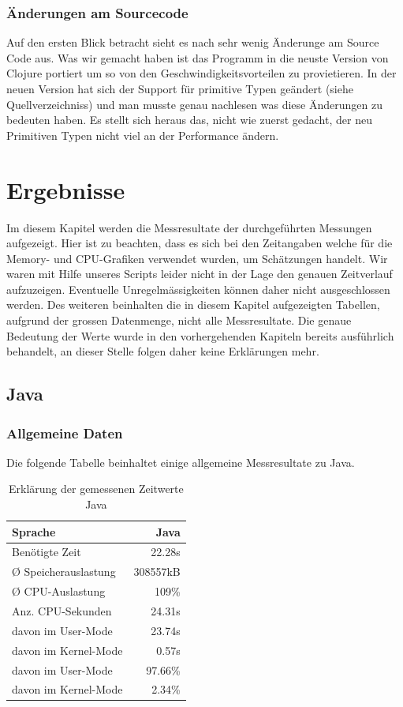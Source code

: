 \documentclass{fancydocument}
\begin{document}
\subsubsection{\"Anderungen am Sourcecode}

Auf den ersten Blick betracht sieht es nach sehr wenig \"Anderunge am
Source Code aus. Was wir gemacht haben ist das Programm in die neuste
Version von Clojure portiert um so von den Geschwindigkeitsvorteilen
zu provietieren. In der neuen Version hat sich der Support f\"ur
primitive Typen ge\"andert (siehe Quellverzeichniss) und man musste
genau nachlesen was diese \"Anderungen zu bedeuten haben. Es stellt
sich heraus das, nicht wie zuerst gedacht, der neu Primitiven Typen
nicht viel an der Performance \"andern.


\section{Ergebnisse}
Im diesem Kapitel werden die Messresultate der durchgeführten Messungen aufgezeigt. Hier ist zu beachten, dass es sich bei den Zeitangaben welche für die Memory- und CPU-Grafiken verwendet wurden, um Schätzungen handelt. Wir waren mit Hilfe unseres Scripts leider nicht in der Lage den genauen Zeitverlauf aufzuzeigen. Eventuelle Unregelmässigkeiten können daher nicht ausgeschlossen werden. Des weiteren beinhalten die in diesem Kapitel aufgezeigten Tabellen, aufgrund der grossen Datenmenge, nicht alle Messresultate. Die genaue Bedeutung der Werte wurde in den vorhergehenden Kapiteln bereits ausführlich behandelt, an dieser Stelle folgen daher keine Erklärungen mehr.

\subsection{Java}
\subsubsection{Allgemeine Daten}
Die folgende Tabelle beinhaltet einige allgemeine Messresultate zu Java. 
\begin{table}[h!]
\centering
\begin{tabular}{|p{6cm}|r|} \hline
Sprache & Java\\
\hline
Benötigte Zeit & 22.28s\\
\hline
Ø Speicherauslastung & 308557kB\\
\hline
Ø CPU-Auslastung & 109\%\\
\hline
Anz. CPU-Sekunden & 24.31s\\
\hline
davon im User-Mode & 23.74s\\
\hline
davon im Kernel-Mode & 0.57s\\
\hline
davon im User-Mode & 97.66\%\\
\hline
davon im Kernel-Mode & 2.34\%\\
\hline
\end{tabular}
\caption{Erklärung der gemessenen Zeitwerte Java}
\end{table}
\end{document}

